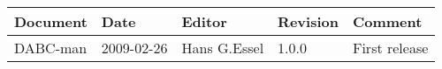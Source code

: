 \begin{table}[h]
\begin{tabular}{|p{2.0cm}|p{2.0cm}|p{3.0cm}|p{1.6cm}|p{5.0cm}|} \hline
Document   & Date        & Editor       & Revision & Comment \\ \hline
DABC-man & 2009-02-26 & Hans G.Essel & 1.0.0      & First release \\ \hline
\end{tabular}
\end{table}
